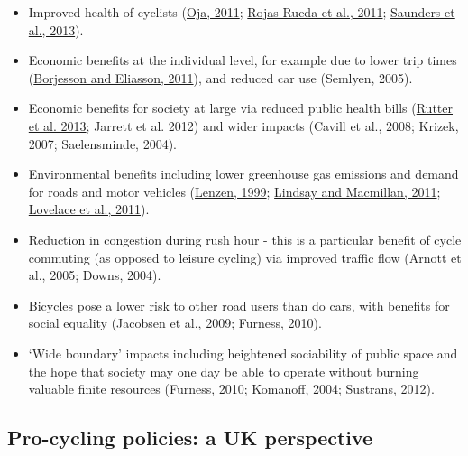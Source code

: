 \begin{itemize}
\item
  Improved health of cyclists
  (\href{http://www.fietsersbond.be/sites/default/files/Heath\%20benefits\%20of\%20cycling\%20REVIEW\%20\%28Oja\%202011\%29.pdf}{Oja,
  2011};
  \href{http://www.creal.cat/media/upload/pdf/articledavidrojas_editora_2_217_1.pdf}{Rojas-Rueda
  et al., 2011};
  \href{http://dx.plos.org/10.1371/journal.pone.0069912}{Saunders et
  al., 2013}).
\item
  Economic benefits at the individual level, for example due to lower
  trip times
  (\href{http://www.researchgate.net/publication/228341559_The_value_of_time_and_external_benefits_in_bicycle_cost-benefit_analysEs/file/e0b495165b88274e0c.pdf}{Borjesson
  and Eliasson, 2011}), and reduced car use (Semlyen, 2005).
\item
  Economic benefits for society at large via reduced public health bills
  (\href{http://www.sciencedirect.com/science/article/pii/S0749379712007301}{Rutter
  et al. 2013}; Jarrett et al. 2012) and wider impacts (Cavill et al.,
  2008; Krizek, 2007; Saelensminde, 2004).
\item
  Environmental benefits including lower greenhouse gas emissions and
  demand for roads and motor vehicles
  (\href{http://www.sciencedirect.com/science/article/B6VH8-3WMK47K-4/2/707d71a2636a20c4e40d703ae128b1c7}{Lenzen,
  1999};
  \href{http://onlinelibrary.wiley.com/doi/10.1111/j.1753-6405.2010.00621.x/abstract;jsessionid=111BFA6034AF092673E1C985C07238E8.f01t04?deniedAccessCustomisedMessage=\&userIsAuthenticated=false}{Lindsay
  and Macmillan, 2011};
  \href{http://linkinghub.elsevier.com/retrieve/pii/S0301421511000620}{Lovelace
  et al., 2011}).
\item
  Reduction in congestion during rush hour - this is a particular
  benefit of cycle commuting (as opposed to leisure cycling) via
  improved traffic flow (Arnott et al., 2005; Downs, 2004).
\item
  Bicycles pose a lower risk to other road users than do cars, with
  benefits for social equality (Jacobsen et al., 2009; Furness, 2010).
\item
  `Wide boundary' impacts including heightened sociability of public
  space and the hope that society may one day be able to operate without
  burning valuable finite resources (Furness, 2010; Komanoff, 2004;
  Sustrans, 2012).
\end{itemize}

\subsection{Pro-cycling policies: a UK
perspective}\label{pro-cycling-policies-a-uk-perspective}

